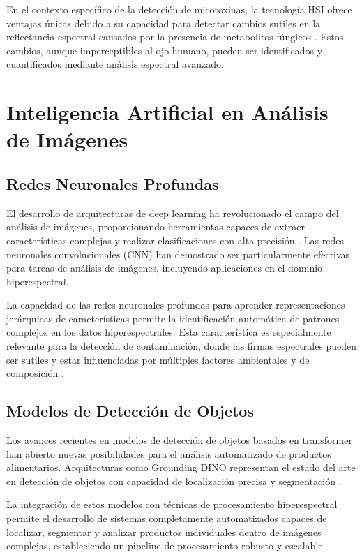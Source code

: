 En el contexto específico de la detección de micotoxinas, la tecnología HSI ofrece ventajas únicas debido a su capacidad para detectar cambios sutiles en la reflectancia espectral causados por la presencia de metabolitos fúngicos \cite{bellantuono2021machine}. Estos cambios, aunque imperceptibles al ojo humano, pueden ser identificados y cuantificados mediante análisis espectral avanzado.

\section{Inteligencia Artificial en Análisis de Imágenes}

\subsection{Redes Neuronales Profundas}
El desarrollo de arquitecturas de deep learning ha revolucionado el campo del análisis de imágenes, proporcionando herramientas capaces de extraer características complejas y realizar clasificaciones con alta precisión \cite{goodfellow2016deep,lecun2015deep}. Las redes neuronales convolucionales (CNN) han demostrado ser particularmente efectivas para tareas de análisis de imágenes, incluyendo aplicaciones en el dominio hiperespectral.

La capacidad de las redes neuronales profundas para aprender representaciones jerárquicas de características permite la identificación automática de patrones complejos en los datos hiperespectrales. Esta característica es especialmente relevante para la detección de contaminación, donde las firmas espectrales pueden ser sutiles y estar influenciadas por múltiples factores ambientales y de composición \cite{vinayakumar2019deep,ferrag2020deep}.

\subsection{Modelos de Detección de Objetos}
Los avances recientes en modelos de detección de objetos basados en transformer han abierto nuevas posibilidades para el análisis automatizado de productos alimentarios. Arquitecturas como Grounding DINO representan el estado del arte en detección de objetos con capacidad de localización precisa y segmentación \cite{liu2023grounding}.

La integración de estos modelos con técnicas de procesamiento hiperespectral permite el desarrollo de sistemas completamente automatizados capaces de localizar, segmentar y analizar productos individuales dentro de imágenes complejas, estableciendo un pipeline de procesamiento robusto y escalable.

